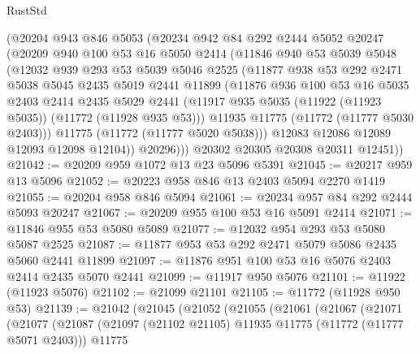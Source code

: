 \begin{lexlean}{RustStd}
\begin{coremodule}
        (@20204
          @943
          @846
          @5053
          (@20234
            @942
            @84
            @292
            @2444
            @5052
            @20247
            (@20209
              @940
              @100
              @53
              @16
              @5050
              @2414
              (@11846
                @940
                @53
                @5039
                @5048
                (@12032
                  @939
                  @293
                  @53
                  @5039
                  @5046
                  @2525
                  (@11877
                    @938
                    @53
                    @292
                    @2471
                    @5038
                    @5045
                    @2435
                    @5019
                    @2441
                    @11899
                    (@11876
                      @936
                      @100
                      @53
                      @16
                      @5035
                      @2403
                      @2414
                      @2435
                      @5029
                      @2441
                      (@11917 @935 @5035 (@11922 (@11923 @5035)) (@11772 (@11928 @935 @53)))
                      @11935
                      @11775
                      (@11772 (@11777 @5030 @2403)))
                    @11775
                    (@11772 (@11777 @5020 @5038)))
                  @12083
                  @12086
                  @12089
                  @12093
                  @12098
                  @12104))
              @20296)))
        @20302
        @20305
        @20308
        @20311
        @12451))
@21042 := @20209 @959 @1072 @13 @23 @5096 @5391
@21045 := @20217 @959 @13 @5096
@21052 := @20223 @958 @846 @13 @2403 @5094 @2270 @1419
@21055 := @20204 @958 @846 @5094
@21061 := @20234 @957 @84 @292 @2444 @5093 @20247
@21067 := @20209 @955 @100 @53 @16 @5091 @2414
@21071 := @11846 @955 @53 @5080 @5089
@21077 := @12032 @954 @293 @53 @5080 @5087 @2525
@21087 := @11877 @953 @53 @292 @2471 @5079 @5086 @2435 @5060 @2441 @11899
@21097 := @11876 @951 @100 @53 @16 @5076 @2403 @2414 @2435 @5070 @2441
@21099 := @11917 @950 @5076
@21101 := @11922 (@11923 @5076)
@21102 := @21099 @21101
@21105 := @11772 (@11928 @950 @53)
@21139 := @21042
    (@21045
      (@21052
        (@21055
          (@21061
            (@21067
              (@21071
                (@21077
                  (@21087
                    (@21097 (@21102 @21105) @11935 @11775 (@11772 (@11777 @5071 @2403)))
                    @11775

\end{coremodule}
\end{lexlean}
